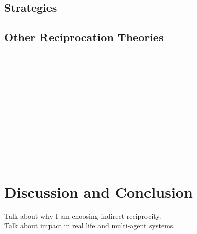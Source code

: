 \documentclass[twoside,twocolumn]{article}
\begin{document}
\subsection{Strategies}

\subsection{Other Reciprocation Theories}



~\cite{arithmetics_of_mutual_help}\\
~\cite{five_rules_coop}\\
~\cite{evolution_of_cooperation}\\
~\cite{evol_indirect_image}\\
~\cite{evol_graph}\\
~\cite{multilevel_nowak}\\
~\cite{phelps_game_theoretic_analysis}\\
~\cite{spatial}\\
~\cite{heterogenous}\\
~\cite{evoldirindir}\\
~\cite{extortion}\\


\section{Discussion and Conclusion}
Talk about why I am choosing indirect reciprocity.\\
Talk about impact in real life and multi-agent systems.\\
~\cite{sticklebacks}\\
~\cite{prisonersdilemma}\\



{}


\end{document}
